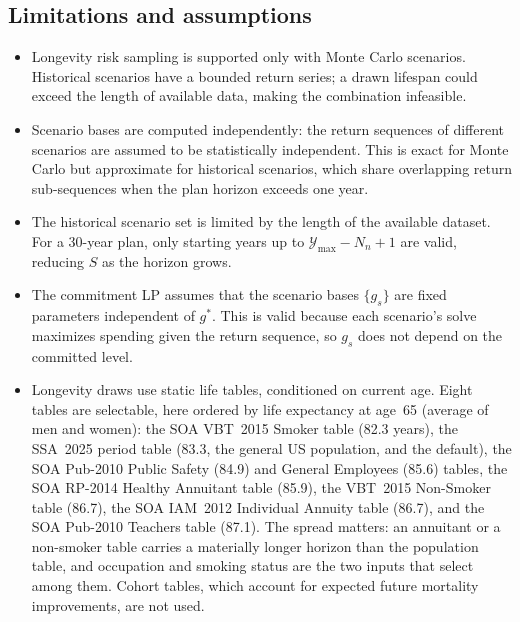 \documentclass[fleqn,12pt]{report}
\begin{document}
\subsection*{Limitations and assumptions}

\begin{itemize}[nosep]
    \item Longevity risk sampling is supported only with Monte Carlo scenarios.
          Historical scenarios have a bounded return series; a drawn lifespan
          could exceed the length of available data, making the combination
          infeasible.
    \item Scenario bases are computed independently: the return sequences of
          different scenarios are assumed to be statistically independent.
          This is exact for Monte Carlo but approximate for historical
          scenarios, which share overlapping return sub-sequences when the
          plan horizon exceeds one year.
    \item The historical scenario set is limited by the length of the
          available dataset.
          For a 30-year plan, only starting years up to
          $\mathcal{Y}_{\max} - N_n + 1$ are valid, reducing $S$
          as the horizon grows.
    \item The commitment LP assumes that the scenario bases $\{g_s\}$ are
          fixed parameters independent of $g^*$.
          This is valid because each scenario's solve maximizes spending given the
          return sequence, so $g_s$ does not depend on the committed level.
    \item Longevity draws use static life tables, conditioned on current age.
          Eight tables are selectable, here ordered by life expectancy at age~65
          (average of men and women): the SOA VBT~2015 Smoker table (82.3 years),
          the SSA~2025 period table (83.3, the general US population, and the default),
          the SOA Pub-2010 Public Safety (84.9) and General Employees (85.6) tables,
          the SOA RP-2014 Healthy Annuitant table (85.9), the VBT~2015 Non-Smoker
          table (86.7), the SOA IAM~2012 Individual Annuity table (86.7), and the
          SOA Pub-2010 Teachers table (87.1).  The spread matters: an annuitant or a non-smoker table carries a
          materially longer horizon than the population table, and occupation and
          smoking status are the two inputs that select among them.
          Cohort tables, which account for expected future mortality improvements,
          are not used.
\end{itemize}
\end{document}
